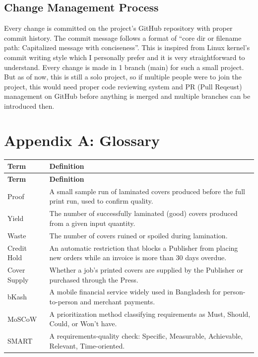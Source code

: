 \documentclass{scrreprt}
\begin{document}
\section{Change Management Process}
Every change is committed on the project's GitHub repository with proper commit history. The commit message follows a format of ``core dir or filename path: Capitalized message with conciseness''. This is inspired from Linux kernel's commit writing style which I personally prefer and it is very straightforward to understand.
Every change is made in 1 branch (main) for such a small project. But as of now, this is still a solo project, so if multiple people were to join the project, this would need proper code reviewing system and PR (Pull Reqeust) management on GitHub before anything is merged and multiple branches can be introduced then.

\chapter*{Appendix A: Glossary}
\begin{longtable}{L{0.22\textwidth} L{0.78\textwidth}}
\toprule
{} \textbf{Term} & \textbf{Definition} \\
\midrule
\endfirsthead
\toprule
{} \textbf{Term} & \textbf{Definition} \\
\midrule
\endhead
Proof & A small sample run of laminated covers produced before the full print run, used to confirm quality. \\
Yield & The number of successfully laminated (good) covers produced from a given input quantity. \\
Waste & The number of covers ruined or spoiled during lamination. \\
Credit Hold & An automatic restriction that blocks a Publisher from placing new orders while an invoice is more than 30 days overdue. \\
Cover Supply & Whether a job's printed covers are supplied by the Publisher or purchased through the Press. \\
bKash & A mobile financial service widely used in Bangladesh for person-to-person and merchant payments. \\
MoSCoW & A prioritization method classifying requirements as Must, Should, Could, or Won't have. \\
SMART & A requirements-quality check: Specific, Measurable, Achievable, Relevant, Time-oriented. \\
\bottomrule
\end{longtable}
\end{document}
